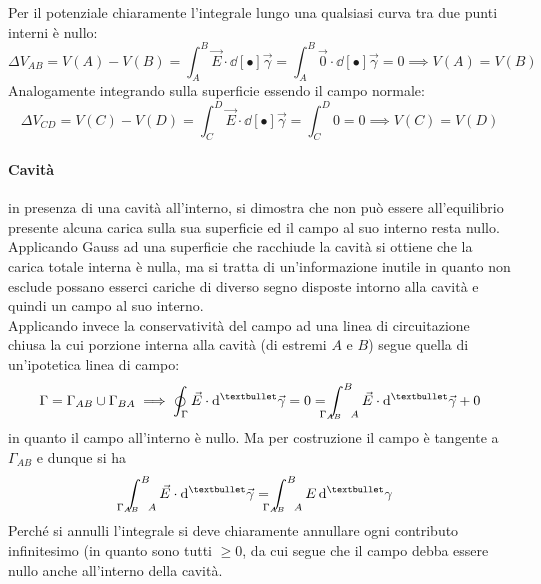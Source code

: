 Per il potenziale chiaramente l'integrale lungo una qualsiasi curva tra due punti interni è nullo:
\[\Delta V_{AB} = V(A) - V(B) = \int_A^B \vec{E} \cdot \dd[•]{\vec{\gamma}} = \int_A^B \vec{0} \cdot \dd[•]{\vec{\gamma}} = 0 \implies V(A) = V(B)\]
Analogamente integrando sulla superficie essendo il campo normale:
\[\Delta V_{CD} = V(C) - V(D) = \int_C^D \vec{E} \cdot \dd[•]{\vec{\gamma}} = \int_C^D 0 = 0 \implies V(C) = V(D)\]


\paragraph{Cavità} in presenza di una cavità all'interno, si dimostra che non può essere all'equilibrio presente alcuna carica sulla sua superficie ed il campo al suo interno resta nullo. 
\\Applicando Gauss ad una superficie che racchiude la cavità si ottiene che la carica totale interna è nulla, ma si tratta di un'informazione inutile in quanto non esclude possano esserci cariche di diverso segno disposte intorno alla cavità e quindi un campo al suo interno.
\\Applicando invece la conservatività del campo ad una linea di circuitazione chiusa la cui porzione interna alla cavità (di estremi $A$ e $B$) segue quella di un'ipotetica linea di campo:
\[\Gamma = \Gamma_{AB} \cup \Gamma_{BA} \implies \oint_\Gamma \vec{E} \cdot \dd[•]{\vec{\gamma}} = 0 = \int_{\hspace{-0.45cm} \Gamma_{AB} \hspace{0.22cm} A}^B \vec{E} \cdot \dd[•]{\vec{\gamma}} + 0 \]
in quanto il campo all'interno è nullo. Ma per costruzione il campo è tangente a $\Gamma_{AB}$ e dunque si ha
\[\int_{\hspace{-0.45cm} \Gamma_{AB} \hspace{0.22cm} A}^B \vec{E} \cdot \dd[•]{\vec{\gamma}} = \int_{\hspace{-0.45cm} \Gamma_{AB} \hspace{0.22cm} A}^B E \dd[•]{\gamma}\]
Perché si annulli l'integrale si deve chiaramente annullare ogni contributo infinitesimo (in quanto sono tutti $\geq 0$, da cui segue che il campo debba essere nullo anche all'interno della cavità.


